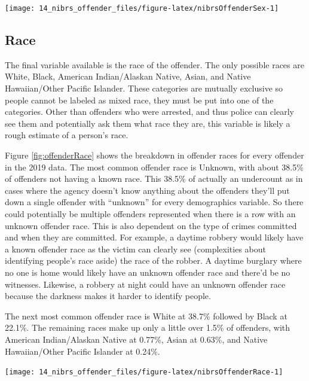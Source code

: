 \documentclass[
]{krantz}
\let\origfigure\figure
\let\endorigfigure\endfigure
\renewenvironment{figure}[1][2] {
    \expandafter\origfigure\expandafter[H]
} {
    \endorigfigure
}
\begin{document}
\begin{figure}

{\centering \texttt{[image: 14\_nibrs\_offender\_files/figure-latex/nibrsOffenderSex-1]} 

}

\caption{The share of offenders by sex, 1991-2022.}\label{fig:nibrsOffenderSex}
\end{figure}

\subsection{Race}\label{race-2}

The final variable available is the race of the offender.
The only possible races are White, Black, American
Indian/Alaskan Native, Asian, and Native Hawaiian/Other
Pacific Islander. These categories are mutually exclusive so
people cannot be labeled as mixed race, they must be put
into one of the categories. Other than offenders who were
arrested, and thus police can clearly see them and
potentially ask them what race they are, this variable is
likely a rough estimate of a person's race.

Figure \ref{fig:offenderRace} shows the breakdown in
offender races for every offender in the 2019 data. The most
common offender race is Unknown, with about 38.5\% of
offenders not having a known race. This 38.5\% of actually
an undercount as in cases where the agency doesn't know
anything about the offenders they'll put down a single
offender with ``unknown'' for every demographics variable.
So there could potentially be multiple offenders represented
when there is a row with an unknown offender race. This is
also dependent on the type of crimes committed and when they
are committed. For example, a daytime robbery would likely
have a known offender race as the victim can clearly see
(complexities about identifying people's race aside) the
race of the robber. A daytime burglary where no one is home
would likely have an unknown offender race and there'd be no
witnesses. Likewise, a robbery at night could have an
unknown offender race because the darkness makes it harder
to identify people.

The next most common offender race is White at 38.7\%
followed by Black at 22.1\%. The remaining races make up
only a little over 1.5\% of offenders, with American
Indian/Alaskan Native at 0.77\%, Asian at 0.63\%, and Native
Hawaiian/Other Pacific Islander at 0.24\%.

\begin{figure}

{\centering \texttt{[image: 14\_nibrs\_offender\_files/figure-latex/nibrsOffenderRace-1]} 

}

\caption{The share of offenders by race, 1991-2022.}\label{fig:nibrsOffenderRace}
\end{figure}
\end{document}

